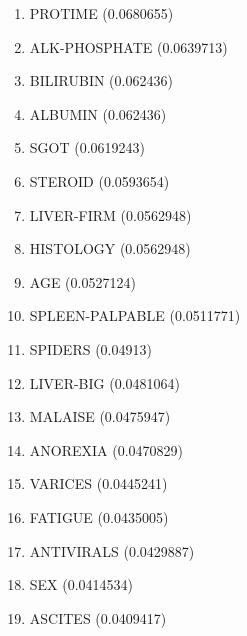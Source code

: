 \begin{enumerate}
\item PROTIME (0.0680655)
\item ALK-PHOSPHATE (0.0639713)
\item BILIRUBIN (0.062436)
\item ALBUMIN (0.062436)
\item SGOT (0.0619243)
\item STEROID (0.0593654)
\item LIVER-FIRM (0.0562948)
\item HISTOLOGY (0.0562948)
\item AGE (0.0527124)
\item SPLEEN-PALPABLE (0.0511771)
\item SPIDERS (0.04913)
\item LIVER-BIG (0.0481064)
\item MALAISE (0.0475947)
\item ANOREXIA (0.0470829)
\item VARICES (0.0445241)
\item FATIGUE (0.0435005)
\item ANTIVIRALS (0.0429887)
\item SEX (0.0414534)
\item ASCITES (0.0409417)
\end{enumerate}